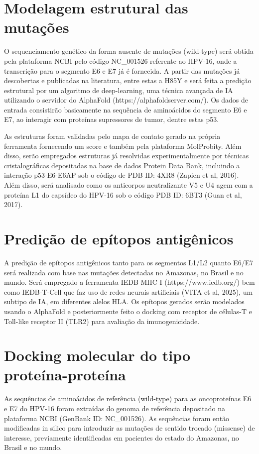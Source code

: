 \section{Modelagem estrutural das mutações}

O sequenciamento genético da forma ausente de mutações (wild-type) será obtida pela plataforma NCBI pelo código NC\_001526 referente ao HPV-16, onde a transcrição para o segmento E6 e E7 já é fornecida. A partir das mutações já descobertas e publicadas na literatura, entre estas a H85Y e  será feita a predição estrutural por um algoritmo de deep-learning, uma técnica avançada de IA utilizando o servidor do AlphaFold (https://alphafoldserver.com/). Os dados de entrada consistirão basicamente na sequência de aminoácidos do segmento E6 e E7, ao interagir com proteínas supressores de tumor, dentre estas p53. 

As estruturas foram validadas pelo mapa de contato gerado na própria ferramenta fornecendo um score e também pela plataforma MolProbity. Além disso, serão empregados estruturas já resolvidas experimentalmente por técnicas cristalográficas depositadas na base de dados Protein Data Bank, incluindo a interação p53-E6-E6AP sob o código de PDB ID: 4XR8 (Zapien et al, 2016). Além disso, será analisado como os anticorpos neutralizante V5 e U4 agem com a proteína L1 do capsídeo do HPV-16 sob o código PDB ID: 6BT3 (Guan et al, 2017).

\section{Predição de epítopos antigênicos}

A predição de epítopos antigênicos tanto para os segmentos L1/L2 quanto E6/E7 será realizada com base nas mutações detectadas no Amazonas, no Brasil e no mundo. Será empregado a ferramenta IEDB-MHC-I (https://www.iedb.org/) bem como IEDB-T-Cell que faz uso de redes neurais artificiais (VITA et al, 2025), um subtipo de IA, em diferentes alelos HLA. Os epítopos gerados serão modelados usando o AlphaFold e posteriormente feito o docking com receptor de células-T e Toll-like receptor II (TLR2) para avaliação da imunogenicidade.

\section{Docking molecular do tipo proteína-proteína}

As sequências de aminoácidos de referência (wild-type) para as oncoproteínas E6 e E7 do HPV-16 foram extraídas do genoma de referência depositado na plataforma NCBI (GenBank ID: NC\_001526). As sequências foram então modificadas in silico para introduzir as mutações de sentido trocado (missense) de interesse, previamente identificadas em pacientes do estado do Amazonas, no Brasil e no mundo.

